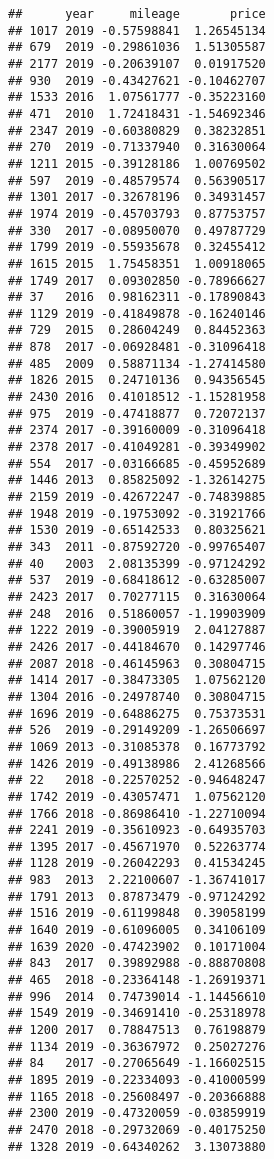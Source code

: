 \documentclass[
]{article}
\begin{document}
\begin{verbatim}
##      year     mileage       price
## 1017 2019 -0.57598841  1.26545134
## 679  2019 -0.29861036  1.51305587
## 2177 2019 -0.20639107  0.01917520
## 930  2019 -0.43427621 -0.10462707
## 1533 2016  1.07561777 -0.35223160
## 471  2010  1.72418431 -1.54692346
## 2347 2019 -0.60380829  0.38232851
## 270  2019 -0.71337940  0.31630064
## 1211 2015 -0.39128186  1.00769502
## 597  2019 -0.48579574  0.56390517
## 1301 2017 -0.32678196  0.34931457
## 1974 2019 -0.45703793  0.87753757
## 330  2017 -0.08950070  0.49787729
## 1799 2019 -0.55935678  0.32455412
## 1615 2015  1.75458351  1.00918065
## 1749 2017  0.09302850 -0.78966627
## 37   2016  0.98162311 -0.17890843
## 1129 2019 -0.41849878 -0.16240146
## 729  2015  0.28604249  0.84452363
## 878  2017 -0.06928481 -0.31096418
## 485  2009  0.58871134 -1.27414580
## 1826 2015  0.24710136  0.94356545
## 2430 2016  0.41018512 -1.15281958
## 975  2019 -0.47418877  0.72072137
## 2374 2017 -0.39160009 -0.31096418
## 2378 2017 -0.41049281 -0.39349902
## 554  2017 -0.03166685 -0.45952689
## 1446 2013  0.85825092 -1.32614275
## 2159 2019 -0.42672247 -0.74839885
## 1948 2019 -0.19753092 -0.31921766
## 1530 2019 -0.65142533  0.80325621
## 343  2011 -0.87592720 -0.99765407
## 40   2003  2.08135399 -0.97124292
## 537  2019 -0.68418612 -0.63285007
## 2423 2017  0.70277115  0.31630064
## 248  2016  0.51860057 -1.19903909
## 1222 2019 -0.39005919  2.04127887
## 2426 2017 -0.44184670  0.14297746
## 2087 2018 -0.46145963  0.30804715
## 1414 2017 -0.38473305  1.07562120
## 1304 2016 -0.24978740  0.30804715
## 1696 2019 -0.64886275  0.75373531
## 526  2019 -0.29149209 -1.26506697
## 1069 2013 -0.31085378  0.16773792
## 1426 2019 -0.49138986  2.41268566
## 22   2018 -0.22570252 -0.94648247
## 1742 2019 -0.43057471  1.07562120
## 1766 2018 -0.86986410 -1.22710094
## 2241 2019 -0.35610923 -0.64935703
## 1395 2017 -0.45671970  0.52263774
## 1128 2019 -0.26042293  0.41534245
## 983  2013  2.22100607 -1.36741017
## 1791 2013  0.87873479 -0.97124292
## 1516 2019 -0.61199848  0.39058199
## 1640 2019 -0.61096005  0.34106109
## 1639 2020 -0.47423902  0.10171004
## 843  2017  0.39892988 -0.88870808
## 465  2018 -0.23364148 -1.26919371
## 996  2014  0.74739014 -1.14456610
## 1549 2019 -0.34691410 -0.25318978
## 1200 2017  0.78847513  0.76198879
## 1134 2019 -0.36367972  0.25027276
## 84   2017 -0.27065649 -1.16602515
## 1895 2019 -0.22334093 -0.41000599
## 1165 2018 -0.25608497 -0.20366888
## 2300 2019 -0.47320059 -0.03859919
## 2470 2018 -0.29732069 -0.40175250
## 1328 2019 -0.64340262  3.13073880

\end{verbatim}
\end{document}
